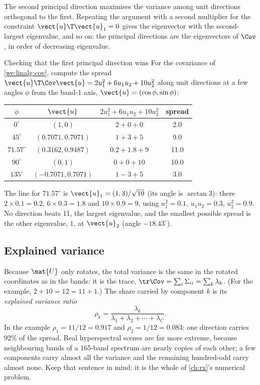 The second principal direction maximises the variance among unit directions orthogonal to the
first. Repeating the argument with a second multiplier for the constraint
$\vect{u}\T\vect{u}_1 = 0$ gives the eigenvector with the second-largest eigenvalue, and so on: the
principal directions are the eigenvectors of $\Cov$, in order of decreasing eigenvalue.

\begin{worked}[label={we:linalg:pcacheck}]{Checking that the first principal direction wins}
For the covariance of \cref{we:linalg:cov}, compute the spread
$\vect{u}\T\Cov\vect{u} = 2u_1^2 + 6u_1u_2 + 10u_2^2$ along unit directions at a few angles
$\phi$ from the band-1 axis, $\vect{u} = (\cos\phi, \sin\phi)$:
\begin{center}
\begin{tabular}{cccc}
\toprule
$\phi$ & $\vect{u}$ & $2u_1^2 + 6u_1u_2 + 10u_2^2$ & spread\\
\midrule
$0^\circ$  & $(1, 0)$          & $2 + 0 + 0$                 & 2.0\\
$45^\circ$ & $(0.7071, 0.7071)$ & $1 + 3 + 5$                & 9.0\\
$71.57^\circ$ & $(0.3162, 0.9487)$ & $0.2 + 1.8 + 9$       & 11.0\\
$90^\circ$ & $(0, 1)$          & $0 + 0 + 10$                & 10.0\\
$135^\circ$ & $(-0.7071, 0.7071)$ & $1 - 3 + 5$              & 3.0\\
\bottomrule
\end{tabular}
\end{center}
The line for $71.57^\circ$ is $\vect{u}_1 = (1,3)/\sqrt{10}$ (its angle is $\arctan 3$): there
$2\times0.1 = 0.2$, $6\times0.3 = 1.8$ and $10\times0.9 = 9$, using $u_1^2 = 0.1$,
$u_1u_2 = 0.3$, $u_2^2 = 0.9$. No direction beats 11, the largest eigenvalue, and the smallest
possible spread is the other eigenvalue, 1, at $\vect{u}_2$ (angle $-18.43^\circ$).
\end{worked}

\subsection{Explained variance}

Because $\mat{U}$ only rotates, the total variance is the same in the rotated coordinates as in
the bands: it is the trace, $\tr\Cov = \sum_i \Sigma_{ii} = \sum_k\lambda_k$. (For the example,
$2 + 10 = 12 = 11 + 1$.) The share carried by component $k$ is its \emph{explained variance
ratio}
\begin{equation}\label{eq:linalg:evr}
\rho_k = \frac{\lambda_k}{\lambda_1 + \lambda_2 + \cdots + \lambda_C}.
\end{equation}
In the example $\rho_1 = 11/12 = 0.917$ and $\rho_2 = 1/12 = 0.083$: one direction carries 92\%
of the spread. Real hyperspectral scenes are far more extreme, because neighbouring bands of a
165-band spectrum are nearly copies of each other; a few components carry almost all the
variance and the remaining hundred-odd carry almost none. Keep that sentence in mind: it is the
whole of \cref{ch:rx}'s numerical problem.

